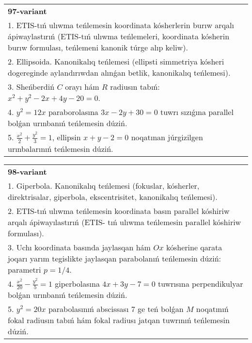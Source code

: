 \documentclass{article}
\begin{document}
\begin{tabular}{m{17cm}}
\textbf{97-variant}\\
1. ETIS-tıń ulıwma teńlemesin koordinata kósherlerin burıw arqalı ápiwaylastırıń (ETIS-tıń ulıwma teńlemeleri, koordinata kósherin burıw formulası, teńlemeni kanonik túrge alıp keliw).\\

2. Ellipsoida. Kanonikalıq teńlemesi (ellipsti simmetriya kósheri dogereginde aylandırıwdan alınǵan betlik, kanonikalıq teńlemesi).\\

3. Sheńberdiń $C$ orayı hám $R$ radiusın tabıń: $x^2+y^2-2 x+4 y-20=0$.\\

4. $y^{2} = 12x$ paraborolasına $3x - 2y + 30 = 0$ tuwrı sızıǵına parallel bolǵan urınbanıń teńlemesin dúziń.  \\

5. $\frac{x^{2}}{2} + \frac{y^{2}}{3} = 1$, ellipsin $x + y - 2 = 0$ noqatınan júrgizilgen urınbalarınıń teńlemesin dúziń.  
\end{tabular}
\vspace{1cm}


\begin{tabular}{m{17cm}}
\textbf{98-variant}\\
1. Giperbola. Kanonikalıq teńlemesi (fokuslar, kósherler, direktrisalar, giperbola, ekscentrisitet, kanonikalıq teńlemesi).\\

2. ETIS-tıń ulıwma teńlemesin koordinata basın parallel kóshiriw arqalı ápiwayılastırıń (ETIS- tıń ulıwma teńlemesin parallel kóshiriw formulası).\\

3. Uchı koordinata basında jaylasqan hám $Ox$ kósherine qarata joqarı yarım tegislikte jaylasqan parabolanıń teńlemesin dúziń: parametri $p=1/4$.\\

4. $\frac{x^{2}}{20} - \frac{y^{2}}{5} = 1$ giperbolasına $4x + 3y - 7 = 0$ tuwrısına perpendikulyar bolǵan urınbanıń teńlemesin dúziń.  \\

5. $y^{2} = 20x$ parabolasınıń abscissası 7 ge teń bolǵan $M$ noqatınıń fokal radiusın tabıń hám fokal radiusı jatqan tuwrınıń teńlemesin dúziń.  
\end{tabular}
\vspace{1cm}
\end{document}
